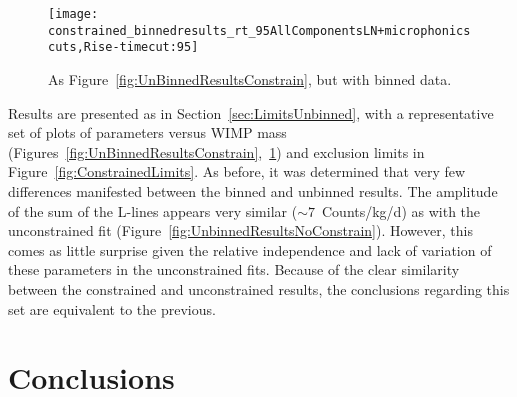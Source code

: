 			\begin{figure}
				\centering				
				\texttt{[image: constrained\_binnedresults\_rt\_95AllComponentsLN+microphonicscuts,Rise-timecut:95]}
								
				\caption[Results from an binned fit, constraints on relative amplitude of Ge and Zn lines]
				{As Figure~\ref{fig:UnBinnedResultsConstrain}, but with binned data.}
				\label{fig:BinnedResultsConstrain}
			\end{figure}
			
			\begin{sidewaysfigure}
				\centering
				\caption[Limits on $\sigman$ constraining the relative amplitudes of Ge and Zn L-lines]
				{Limits on $\sigman$ constraining the relative amplitudes of Ge and Zn L-lines.}
				\label{fig:ConstrainedLimits}
			\end{sidewaysfigure}		
			
Results are presented as in Section~\ref{sec:LimitsUnbinned}, with a representative set of plots of parameters versus WIMP mass (Figures~\ref{fig:UnBinnedResultsConstrain},~\ref{fig:BinnedResultsConstrain}) and exclusion limits in Figure~\ref{fig:ConstrainedLimits}.  As before, it was determined that very few differences manifested between the binned and unbinned results.  The amplitude of the sum of the L-lines appears very similar ($\sim7$~Counts/kg/d) as with the unconstrained fit (Figure~\ref{fig:UnbinnedResultsNoConstrain}).  However, this comes as little surprise given the relative independence and lack of variation of these parameters in the unconstrained fits.  Because of the clear similarity between the constrained and unconstrained results, the conclusions regarding this set are equivalent to the previous.  

	\section{Conclusions}
	\label{sec:LowMassWIMPConclusions}

